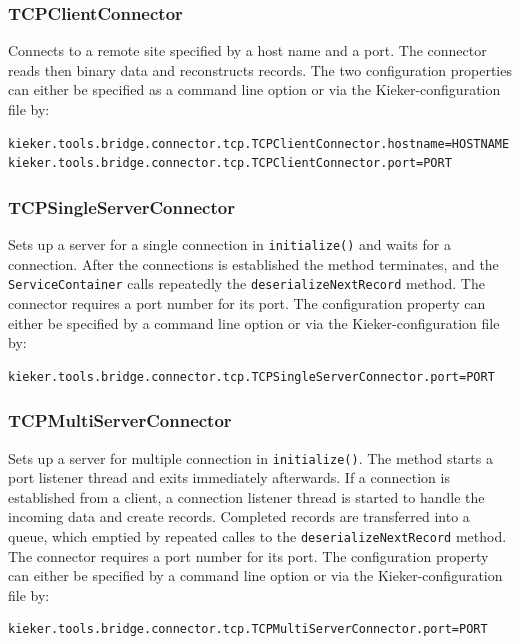 \documentclass[11pt,a4paper]{article}
\begin{document}
%
\subsubsection{TCPClientConnector}

Connects to a remote site specified by a host name and a port. The connector reads then binary data and reconstructs records. The two configuration properties can either be specified as a command line option or via the Kieker-configuration file by:

\begin{verbatim}
kieker.tools.bridge.connector.tcp.TCPClientConnector.hostname=HOSTNAME
kieker.tools.bridge.connector.tcp.TCPClientConnector.port=PORT
\end{verbatim}

%
\subsubsection{TCPSingleServerConnector}

Sets up a server for a single connection in \texttt{initialize()} and waits for a connection. After the connections is established the method terminates, and the \texttt{ServiceContainer} calls repeatedly the \texttt{deserializeNextRecord} method. The connector requires a port number for its port. The configuration property can either be specified by a command line option or via the Kieker-configuration file by:

\begin{verbatim}
kieker.tools.bridge.connector.tcp.TCPSingleServerConnector.port=PORT
\end{verbatim}

%
\subsubsection{TCPMultiServerConnector}

Sets up a server for multiple connection in \texttt{initialize()}. The method starts a port listener thread and exits immediately afterwards. If a connection is established from a client, a connection listener thread is started to handle the incoming data and create records. Completed records are transferred into a queue, which emptied by repeated calles to the \texttt{deserializeNextRecord} method. The connector requires a port number for its port. The configuration property can either be specified by a command line option or via the Kieker-configuration file by:

\begin{verbatim}
kieker.tools.bridge.connector.tcp.TCPMultiServerConnector.port=PORT
\end{verbatim}
\end{document}
